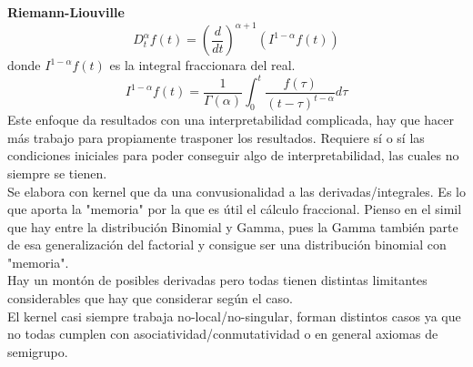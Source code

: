 \documentclass[11pt,a4paper,oneside]{report}
\theoremstyle{definition}
\theoremstyle{plain}
\theoremstyle{remark}
\begin{document}
\textbf{Riemann-Liouville}
\[D_{t}^{\alpha} f(t)= (\frac{d}{dt})^{\alpha +1}(I^{1-\alpha}f(t)) \]
donde $I^{1-\alpha}f(t)$ es la integral fraccionara del real.
\[ I^{1-\alpha}f(t)= \frac{1}{\Gamma (\alpha)} \int_{0}^{t}\frac{f(\tau)}{(t-\tau)^{t-\alpha}}d\tau \]
Este enfoque da resultados con una interpretabilidad complicada, hay que hacer más trabajo para propiamente 
trasponer los resultados. Requiere sí o sí las condiciones iniciales para poder conseguir algo de interpretabilidad,
las cuales no siempre se tienen.\\
Se elabora con kernel que da una convusionalidad a las derivadas/integrales. Es lo que aporta la "memoria" por la 
que es útil el cálculo fraccional. Pienso en el simil que hay entre la distribución Binomial y Gamma, pues la Gamma
también parte de esa generalización del factorial y consigue ser una distribución binomial con "memoria".\\
Hay un montón de posibles derivadas pero todas tienen distintas limitantes considerables que hay que considerar
según el caso. \\
El kernel casi siempre trabaja no-local/no-singular, forman distintos casos ya que no todas cumplen con 
asociatividad/conmutatividad o en general axiomas de semigrupo.\\


\printindex
\end{document}
